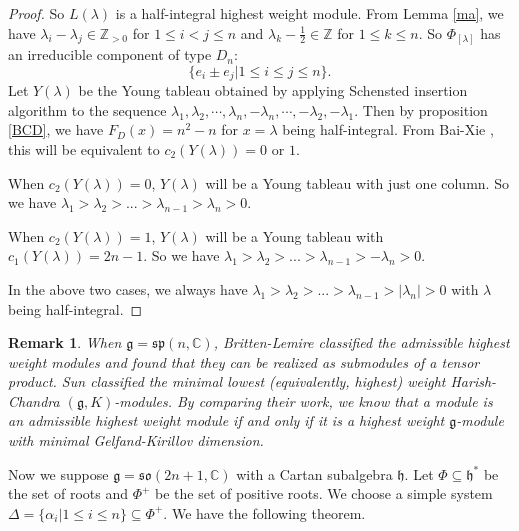 \documentclass{amsart}[12pt]
\newtheorem{Rem}{Remark}[section]
\renewcommand{\subset}{\subseteq}
\numberwithin{equation}{section}
\begin{document}
\begin{proof}
So $L(\lambda)$ is a half-integral highest weight  module. From Lemma \ref{ma}, we have $\lambda_i-\lambda_j \in \mathbb{Z}_{> 0}$ for $1\leq i<j\leq n$ and $\lambda_k-\frac{1}{2} \in \mathbb{Z}$ for $1\leq k\leq n$.
So $\Phi_{[\lambda]}$ has an irreducible component of type $D_n$:
$$\{e_i \pm e_j|1\leq i\leq j\leq n\}.$$
Let $ Y(\lambda) $ be the  Young tableau obtained by applying Schensted insertion algorithm to the sequence \(
\lambda_1,\lambda_2,\cdots,\lambda_n,-\lambda_n,\cdots,-\lambda_2,-\lambda_1\).	Then by proposition \ref{BCD}, we have $F_D(x)=n^2-n$ for $x=\lambda$ being half-integral. From Bai-Xie \cite{BX-2}, this will be equivalent to
$c_2(Y(\lambda))=0$ or $1$.

When $c_2(Y(\lambda))=0$, $Y(\lambda)$ will be a Young tableau with just one column. So we have $\lambda_1>\lambda_2>...>\lambda_{n-1}>\lambda_n>0$.

When $c_2(Y(\lambda))=1$, $Y(\lambda)$ will be a Young tableau with $c_1(Y(\lambda))=2n-1$. So we have
$\lambda_1>\lambda_2>...>\lambda_{n-1}>-\lambda_n>0$.

In the above two cases, we always have $\lambda_1>\lambda_2>...>\lambda_{n-1}>|\lambda_n|>0$ with $\lambda$ being half-integral.

\end{proof}

\begin{Rem}
		When $\mathfrak{g}=\mathfrak{sp}(n, \mathbb{C})$, Britten-Lemire \cite{BL} classified the  admissible highest weight modules and found that they can be realized as submodules of a tensor product. Sun \cite{Sun} classified the minimal lowest (equivalently, highest) weight Harish-Chandra $(\mathfrak{g}, K)$-modules. By comparing their work, we know that a module is an admissible highest weight module if and only if it is a highest weight $\mathfrak{g}$-module  with minimal Gelfand-Kirillov dimension.
	
\end{Rem}
%



Now	we suppose $\mathfrak{g}=\mathfrak{so}(2n+1, \mathbb{C})$ with a Cartan subalgebra $\mathfrak{h}$. Let $\Phi\subseteq \mathfrak{h}^*$ be the set of roots and $\Phi^+$ be the set of positive roots. We choose  a simple system $\Delta=\{\alpha_i|1\leq i\leq n\}\subset\Phi^+$. We have the following theorem.
\end{document}
